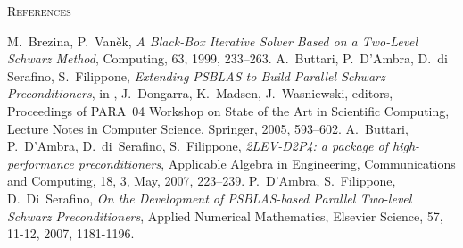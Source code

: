          {\textsc{References}}


\begin{thebibliography}{99}
%
%
M.~Brezina, P.~Van{\v e}k,
{\em A Black-Box Iterative Solver Based on a Two-Level Schwarz Method},
Computing, 63, 1999, 233--263.
%
A.~Buttari, P.~D'Ambra, D.~di Serafino, S.~Filippone,
{\em Extending PSBLAS to Build Parallel Schwarz Preconditioners},
in , J.~Dongarra, K.~Madsen, J.~Wasniewski, editors,
Proceedings of PARA~04 Workshop on State of the Art
in Scientific Computing, Lecture Notes in Computer Science,
Springer, 2005, 593--602.
%
 A.~Buttari, P.~D'Ambra, D.~di~Serafino, S.~Filippone,
{\em 2LEV-D2P4: a package of high-performance preconditioners},
Applicable Algebra in Engineering, Communications and Computing, 
18, 3, May, 2007, 223--239.
%
  P.~D'Ambra, S.~Filippone,  D.~Di~Serafino,
{\em On the Development of PSBLAS-based Parallel Two-level Schwarz Preconditioners},
Applied Numerical Mathematics, Elsevier Science, 
57, 11-12, 2007, 1181-1196.


\end{thebibliography}
